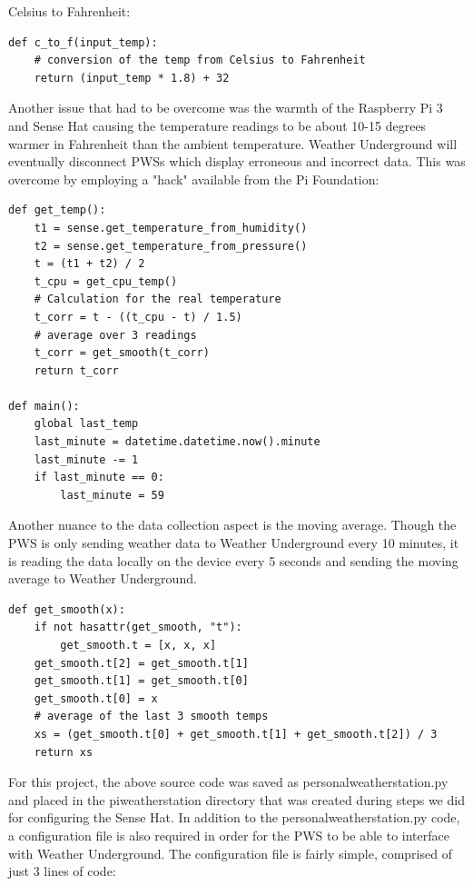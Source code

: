 \documentclass[sigconf]{acmart}
\begin{document}
Celsius to Fahrenheit:
\begin{code}
\begin{verbatim}
def c_to_f(input_temp):
    # conversion of the temp from Celsius to Fahrenheit
    return (input_temp * 1.8) + 32
\end{verbatim}
\end{code}

Another issue that had to be overcome was the warmth of the Raspberry Pi 3 and Sense Hat causing the temperature readings to be about 10-15 degrees warmer in Fahrenheit than the ambient temperature. Weather Underground will eventually disconnect PWSs which display erroneous and incorrect data. This was overcome by employing a "hack" available from the Pi Foundation\cite{PiFoundationHack2017}:

\begin{code}
\begin{verbatim}
def get_temp():
    t1 = sense.get_temperature_from_humidity()
    t2 = sense.get_temperature_from_pressure()
    t = (t1 + t2) / 2
    t_cpu = get_cpu_temp()
    # Calculation for the real temperature 
    t_corr = t - ((t_cpu - t) / 1.5)
    # average over 3 readings
    t_corr = get_smooth(t_corr)
    return t_corr

def main():
    global last_temp
    last_minute = datetime.datetime.now().minute
    last_minute -= 1
    if last_minute == 0:
        last_minute = 59
\end{verbatim}
\end{code}

Another nuance to the data collection aspect is the moving average. Though the PWS is only sending weather data to Weather Underground every 10 minutes, it is reading the data locally on the device every 5 seconds and sending the moving average to Weather Underground. 

\begin{code}
\begin{verbatim}
def get_smooth(x):
    if not hasattr(get_smooth, "t"):
        get_smooth.t = [x, x, x]
    get_smooth.t[2] = get_smooth.t[1]
    get_smooth.t[1] = get_smooth.t[0]
    get_smooth.t[0] = x
    # average of the last 3 smooth temps
    xs = (get_smooth.t[0] + get_smooth.t[1] + get_smooth.t[2]) / 3
    return xs
\end{verbatim}
\end{code}

For this project, the above source code was saved as personal\textunderscore weather\textunderscore station.py and placed in the pi\textunderscore weather\textunderscore station directory that was created during steps we did for configuring the Sense Hat. In addition to the personal\textunderscore weather\textunderscore station.py code, a configuration file is also required in order for the PWS to be able to interface with Weather Underground. The configuration file is fairly simple, comprised of just 3 lines of code:
\end{document}
